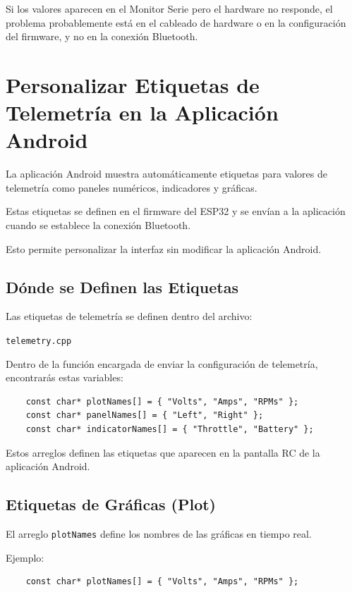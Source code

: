 Si los valores aparecen en el Monitor Serie pero el hardware no responde, el problema probablemente está en el cableado de hardware o en la configuración del firmware, y no en la conexión Bluetooth.

\section{Personalizar Etiquetas de Telemetría en la Aplicación Android}

La aplicación Android muestra automáticamente etiquetas para valores de telemetría
como paneles numéricos, indicadores y gráficas.

Estas etiquetas se definen en el firmware del ESP32 y se envían a la aplicación
cuando se establece la conexión Bluetooth.

Esto permite personalizar la interfaz sin modificar la aplicación Android.

\subsection{Dónde se Definen las Etiquetas}

Las etiquetas de telemetría se definen dentro del archivo:

\begin{center}
    \texttt{telemetry.cpp}
\end{center}

Dentro de la función encargada de enviar la configuración de telemetría, encontrarás estas variables:

\begin{verbatim}
    const char* plotNames[] = { "Volts", "Amps", "RPMs" };
    const char* panelNames[] = { "Left", "Right" };
    const char* indicatorNames[] = { "Throttle", "Battery" };
\end{verbatim}

Estos arreglos definen las etiquetas que aparecen en la pantalla RC de la aplicación Android.

\subsection{Etiquetas de Gráficas (Plot)}

El arreglo \texttt{plotNames} define los nombres de las gráficas en tiempo real.

Ejemplo:

\begin{verbatim}
    const char* plotNames[] = { "Volts", "Amps", "RPMs" };
\end{verbatim}

